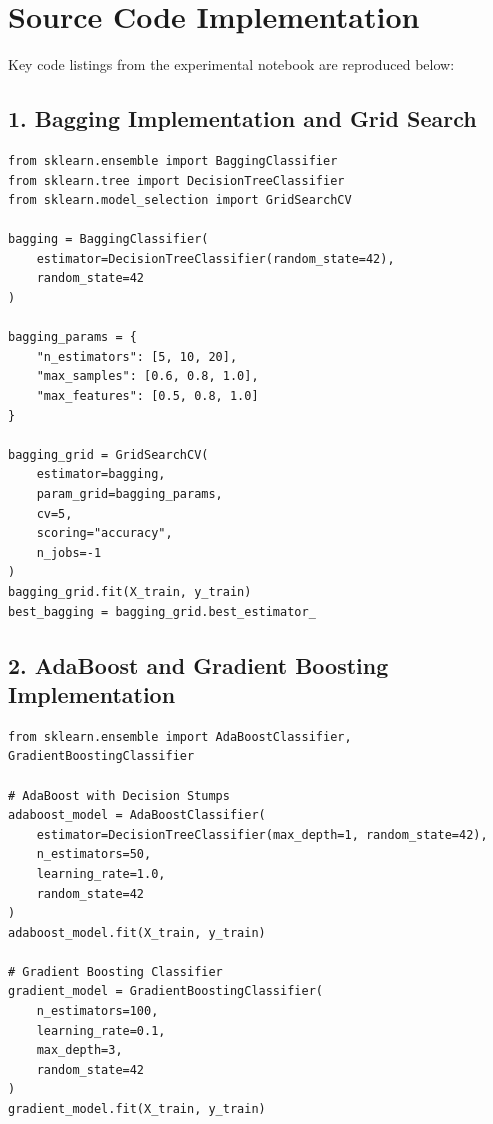 \documentclass[12pt,a4paper]{article}
\begin{document}
\section{Source Code Implementation}

Key code listings from the experimental notebook are reproduced below:

\subsection*{1. Bagging Implementation and Grid Search}
\begin{lstlisting}
from sklearn.ensemble import BaggingClassifier
from sklearn.tree import DecisionTreeClassifier
from sklearn.model_selection import GridSearchCV

bagging = BaggingClassifier(
    estimator=DecisionTreeClassifier(random_state=42),
    random_state=42
)

bagging_params = {
    "n_estimators": [5, 10, 20],
    "max_samples": [0.6, 0.8, 1.0],
    "max_features": [0.5, 0.8, 1.0]
}

bagging_grid = GridSearchCV(
    estimator=bagging,
    param_grid=bagging_params,
    cv=5,
    scoring="accuracy",
    n_jobs=-1
)
bagging_grid.fit(X_train, y_train)
best_bagging = bagging_grid.best_estimator_
\end{lstlisting}

\subsection*{2. AdaBoost and Gradient Boosting Implementation}
\begin{lstlisting}
from sklearn.ensemble import AdaBoostClassifier, GradientBoostingClassifier

# AdaBoost with Decision Stumps
adaboost_model = AdaBoostClassifier(
    estimator=DecisionTreeClassifier(max_depth=1, random_state=42),
    n_estimators=50,
    learning_rate=1.0,
    random_state=42
)
adaboost_model.fit(X_train, y_train)

# Gradient Boosting Classifier
gradient_model = GradientBoostingClassifier(
    n_estimators=100,
    learning_rate=0.1,
    max_depth=3,
    random_state=42
)
gradient_model.fit(X_train, y_train)
\end{lstlisting}
\end{document}
